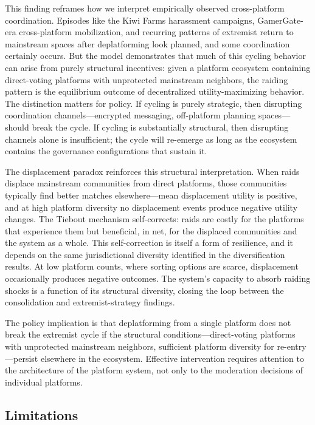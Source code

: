 This finding reframes how we interpret empirically observed cross-platform coordination. Episodes like the Kiwi Farms harassment campaigns, GamerGate-era cross-platform mobilization, and recurring patterns of extremist return to mainstream spaces after deplatforming look planned, and some coordination certainly occurs. But the model demonstrates that much of this cycling behavior can arise from purely structural incentives: given a platform ecosystem containing direct-voting platforms with unprotected mainstream neighbors, the raiding pattern is the equilibrium outcome of decentralized utility-maximizing behavior. The distinction matters for policy. If cycling is purely strategic, then disrupting coordination channels---encrypted messaging, off-platform planning spaces---should break the cycle. If cycling is substantially structural, then disrupting channels alone is insufficient; the cycle will re-emerge as long as the ecosystem contains the governance configurations that sustain it.

The displacement paradox reinforces this structural interpretation. When raids displace mainstream communities from direct platforms, those communities typically find better matches elsewhere---mean displacement utility is positive, and at high platform diversity no displacement events produce negative utility changes. The Tiebout mechanism self-corrects: raids are costly for the platforms that experience them but beneficial, in net, for the displaced communities and the system as a whole. This self-correction is itself a form of resilience, and it depends on the same jurisdictional diversity identified in the diversification results. At low platform counts, where sorting options are scarce, displacement occasionally produces negative outcomes. The system's capacity to absorb raiding shocks is a function of its structural diversity, closing the loop between the consolidation and extremist-strategy findings.

The policy implication is that deplatforming from a single platform does not break the extremist cycle if the structural conditions---direct-voting platforms with unprotected mainstream neighbors, sufficient platform diversity for re-entry---persist elsewhere in the ecosystem. Effective intervention requires attention to the architecture of the platform system, not only to the moderation decisions of individual platforms.

\subsection{Limitations}

